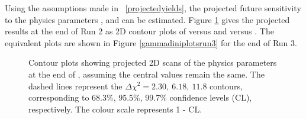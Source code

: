 Using the assumptions made in \tab~\ref{projectedyields}, the projected future sensitivity to the physics parameters \rb, \deltab and \Pgamma can be estimated. Figure \ref{gammadiniplotsrun2} gives the projected results at the end of Run 2 as 2D contour plots of \rb versus \Pgamma and \deltab versus \Pgamma. The equivalent plots are shown in Figure \ref{gammadiniplotsrun3} for the end of Run 3. 

\begin{figure}[h]
\centering
{}
\caption{Contour plots showing projected 2D scans of the physics parameters at the end of \runtwo, assuming the central values remain the same. The dashed lines represent the $\Delta \chi^2 = 2.30,\ 6.18,\ 11.8$ contours, corresponding to 68.3\%, 95.5\%, 99.7\% confidence levels (CL), respectively. The colour scale represents 1 - CL.}
\label{gammadiniplotsrun2}
\end{figure}

